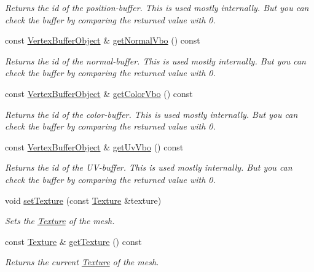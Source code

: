\begin{DoxyCompactItemize}
\begin{DoxyCompactList}\small\item\em Returns the id of the position-\/buffer. This is used mostly internally. But you can check the buffer by comparing the returned value with 0. \end{DoxyCompactList}\item 
const \hyperlink{classburn_1_1_vertex_buffer_object}{Vertex\-Buffer\-Object} \& \hyperlink{classburn_1_1_mesh_a208108027bac8d8a5ac93e6644b8800f}{get\-Normal\-Vbo} () const 
\begin{DoxyCompactList}\small\item\em Returns the id of the normal-\/buffer. This is used mostly internally. But you can check the buffer by comparing the returned value with 0. \end{DoxyCompactList}\item 
const \hyperlink{classburn_1_1_vertex_buffer_object}{Vertex\-Buffer\-Object} \& \hyperlink{classburn_1_1_mesh_acf65c412665d30c1370437a41ef47018}{get\-Color\-Vbo} () const 
\begin{DoxyCompactList}\small\item\em Returns the id of the color-\/buffer. This is used mostly internally. But you can check the buffer by comparing the returned value with 0. \end{DoxyCompactList}\item 
const \hyperlink{classburn_1_1_vertex_buffer_object}{Vertex\-Buffer\-Object} \& \hyperlink{classburn_1_1_mesh_aba7ebd7aeefe581cfb49b6c32d3df091}{get\-Uv\-Vbo} () const 
\begin{DoxyCompactList}\small\item\em Returns the id of the U\-V-\/buffer. This is used mostly internally. But you can check the buffer by comparing the returned value with 0. \end{DoxyCompactList}\item 
void \hyperlink{classburn_1_1_mesh_a2457c00cd236e5933e725bb1d55db0d9}{set\-Texture} (const \hyperlink{classburn_1_1_texture}{Texture} \&texture)
\begin{DoxyCompactList}\small\item\em Sets the \hyperlink{classburn_1_1_texture}{Texture} of the mesh. \end{DoxyCompactList}\item 
const \hyperlink{classburn_1_1_texture}{Texture} \& \hyperlink{classburn_1_1_mesh_aa811fbbefd60cb97afac8af9ecc7d53a}{get\-Texture} () const 
\begin{DoxyCompactList}\small\item\em Returns the current \hyperlink{classburn_1_1_texture}{Texture} of the mesh. \end{DoxyCompactList}\item 

\end{DoxyCompactItemize}
